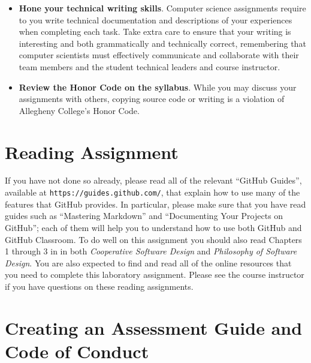 \documentclass[11pt]{article}
\newcommand{\cooperative}{{\em Cooperative Software Design\/}}
\newcommand{\philosophy}{{\em Philosophy of Software Design\/}}
\newcommand{\url}[1]{\lstinline{#1}}
\begin{document}
\begin{itemize}
\item {\bf Hone your technical writing skills}. Computer science assignments
  require to you write technical documentation and descriptions of your
  experiences when completing each task. Take extra care to ensure that your
  writing is interesting and both grammatically and technically correct,
  remembering that computer scientists must effectively communicate and
  collaborate with their team members and the student technical leaders and
  course instructor.

\item {\bf Review the Honor Code on the syllabus}. While you may discuss your
  assignments with others, copying source code or writing is a violation of
  Allegheny College's Honor Code.

\end{itemize}

\section*{Reading Assignment}



If you have not done so already, please read all of the relevant ``GitHub
Guides'', available at \url{https://guides.github.com/}, that explain how to use
many of the features that GitHub provides. In particular, please make sure that
you have read guides such as ``Mastering Markdown'' and ``Documenting Your
Projects on GitHub''; each of them will help you to understand how to use both
GitHub and GitHub Classroom.
%
To do well on this assignment you should also read Chapters 1 through 3 in in
both \cooperative{} and \philosophy{}.
%
You are also expected to find and read all of the online resources that you need
to complete this laboratory assignment.
%
Please see the course instructor if you have questions on these reading
assignments.

\section*{Creating an Assessment Guide and Code of Conduct}

\end{document}
